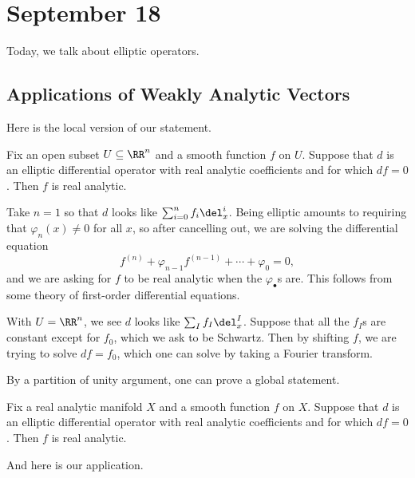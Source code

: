 \documentclass[../notes.tex]{subfiles}
\begin{document}
\section{September 18}
Today, we talk about elliptic operators.

\subsection{Applications of Weakly Analytic Vectors}
Here is the local version of our statement.
\begin{theorem}
	Fix an open subset $U\subseteq\RR^n$ and a smooth function $f$ on $U$. Suppose that $d$ is an elliptic differential operator with real analytic coefficients and for which $df=0$. Then $f$ is real analytic.
\end{theorem}
\begin{example}
	Take $n=1$ so that $d$ looks like $\sum_{i=0}^nf_i\del_x^i$. Being elliptic amounts to requiring that $\varphi_n(x)\ne0$ for all $x$, so after cancelling out, we are solving the differential equation
	\[f^{(n)}+\varphi_{n-1}f^{(n-1)}+\cdots+\varphi_0=0,\]
	and we are asking for $f$ to be real analytic when the $\varphi_\bullet$s are. This follows from some theory of first-order differential equations.
\end{example}
\begin{example}
	With $U=\RR^n$, we see $d$ looks like $\sum_If_I\del_x^I$. Suppose that all the $f_I$s are constant except for $f_0$, which we ask to be Schwartz. Then by shifting $f$, we are trying to solve $df=f_0$, which one can solve by taking a Fourier transform.
\end{example}
By a partition of unity argument, one can prove a global statement.
\begin{corollary} \label{cor:global-elliptic-reg}
	Fix a real analytic manifold $X$ and a smooth function $f$ on $X$. Suppose that $d$ is an elliptic differential operator with real analytic coefficients and for which $df=0$. Then $f$ is real analytic.
\end{corollary}
And here is our application.
\end{document}

